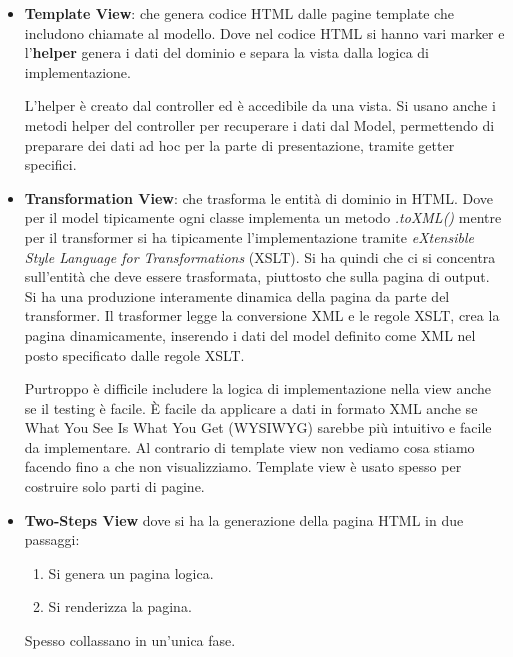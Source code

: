 \begin{itemize}
    \item \textbf{Template View}: che genera codice HTML dalle pagine template
          che includono chiamate al modello. Dove nel codice HTML si hanno vari marker
          e l'\textbf{helper} genera i dati del dominio e separa la vista dalla logica
          di implementazione.

          L'helper è creato dal controller ed è accedibile da una vista. Si usano
          anche i metodi helper del controller per recuperare i dati dal Model,
          permettendo di preparare dei dati ad hoc per la parte di presentazione,
          tramite getter specifici.
    \item \textbf{Transformation View}: che trasforma le entità di dominio in HTML.
          Dove per il model tipicamente ogni classe implementa un metodo \textit{.toXML()}
          mentre per il transformer si ha tipicamente l'implementazione tramite
          \textit{eXtensible Style Language for Transformations} (XSLT). Si ha quindi che ci
          si concentra sull'entità che deve essere trasformata, piuttosto che sulla pagina
          di output. Si ha una produzione interamente dinamica della pagina da parte del
          transformer. Il trasformer legge la conversione XML e le regole XSLT,
          crea la pagina dinamicamente, inserendo i dati del model definito come
          XML nel posto specificato dalle regole XSLT.

          Purtroppo è difficile includere la logica di implementazione nella view
          anche se il testing è facile. È facile da applicare a dati in formato
          XML anche se What You See Is What You Get (WYSIWYG) sarebbe più intuitivo e
          facile da implementare. Al contrario di template view non vediamo cosa
          stiamo facendo fino a che non visualizziamo. Template view è usato spesso
          per costruire solo parti di pagine.
    \item \textbf{Two-Steps View} dove si ha la generazione della pagina HTML in
          due passaggi:
          \begin{enumerate}
              \item Si genera un pagina logica.
              \item Si renderizza la pagina.
          \end{enumerate}
          Spesso collassano in un'unica fase.


\end{itemize}
